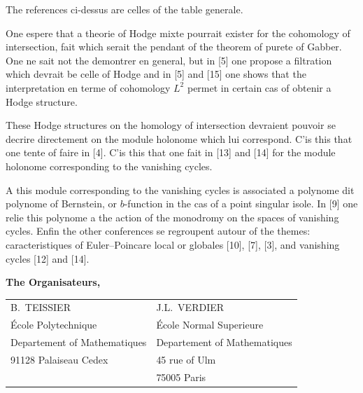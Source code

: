 \documentclass[12pt,a4paper]{article}
\theoremstyle{plain}
\theoremstyle{definition}
\theoremstyle{remark}
\begin{document}
The references ci-dessus are celles of the table generale.
\newpage

\thispagestyle{empty}
\noindent
One espere that a theorie of Hodge mixte pourrait exister for the cohomology of intersection, fait which serait the pendant of the theorem of purete of Gabber. One ne sait not the demontrer en general, but in [5] one propose a filtration which devrait be celle of Hodge and in [5] and [15] one shows that the interpretation en terme of cohomology $L^{2}$ permet in certain cas of obtenir a Hodge structure.

These Hodge structures on the homology of intersection devraient pouvoir se decrire directement on the module holonome which lui correspond. C'is this that one tente of faire in [4]. C'is this that one fait in [13] and [14] for the module holonome corresponding to the vanishing cycles.

A this module corresponding to the vanishing cycles is associated a polynome dit polynome of Bernstein, or $b$-function in the cas of a point singular isole. In [9] one relie this polynome a the action of the monodromy on the spaces of vanishing cycles. Enfin the other conferences se regroupent autour of the themes: caracteristiques of Euler--Poincare local or globales [10], [7], [3], and vanishing cycles [12] and [14].

\vspace{1cm}
\begin{flushright}
\textbf{The Organisateurs,}
\end{flushright}

\vspace{0.5cm}
\begin{center}
\begin{tabular}{ll}
B.~TEISSIER & J.L.~VERDIER \\
\'Ecole Polytechnique & \'Ecole Normal Superieure \\
Departement of Mathematiques & Departement of Mathematiques \\
91128 Palaiseau Cedex & 45 rue of Ulm \\
 & 75005 Paris
\end{tabular}
\end{center}
\newpage

\thispagestyle{empty}
\end{document}
